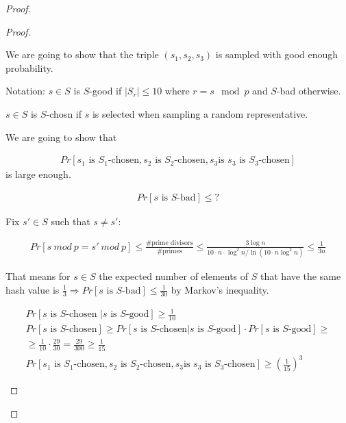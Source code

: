 \begin{proof}
\begin{proof}
\begin{enumerate}
		We are going to show that the triple $(s_1, s_2, s_3)$ is sampled with good enough probability.

		Notation: $s \in S$ is $S$-good if $|S_r| \leq 10$ where $r = s \mod p$ and $S$-bad otherwise.

		$s \in S$ is $S$-chosn if $s$ is selected when sampling a random representative.

		We are going to show that 

		\begin{align*}
		  Pr[s_1 \text{ is }S_1\text{-chosen}, s_2 \text{ is }S_2\text{-chosen}, s_3 \text{is } s_3\text{ is } S_3\text{-chosen}]
		\end{align*}
		is large enough.

		\begin{align*}
		  Pr[s \text{ is }S\text{-bad}] \leq ?
		\end{align*}

		Fix $s' \in S$ such that $s \neq s'$:

		\begin{align*}
		  Pr[s \ mod \ p = s' \ mod \ p] \leq \frac{\text{\# prime divisors}}{\text{\# primes}} \leq \frac{3\log n}{10 \cdot n \cdot \log^2 n / \ln(10 \cdot n \log^2 n)} \leq \frac{1}{3 n}
		\end{align*}

		That means for $s \in S$ the expected number of elements of $S$ that have the same hash value is $\frac{1}{3} \Longrightarrow Pr[s \text{ is } S\text{-bad}] \leq \frac{1}{30}$ by Markov's inequality.


		\begin{align*}
		  Pr[s \text{ is } S\text{-chosen } | s \text{ is  } S\text{-good}] \geq \frac{1}{10} \\
		  Pr[s \text { is } S\text{-chosen}] \geq Pr[s \text{ is } S\text{-chosen} | s \text{ is } S\text{-good}] \cdot Pr[s \text { is } S\text{-good}] \geq \\
		  \geq \frac{1}{10} \cdot \frac{29}{30} = \frac{29}{300} \geq \frac{1}{15} \\
		  Pr[s_1 \text{ is }S_1\text{-chosen}, s_2 \text{ is }S_2\text{-chosen}, s_3 \text{is } s_3\text{ is } S_3\text{-chosen}] \geq \left(\frac{1}{15}\right)^{3}
		\end{align*}

	\end{enumerate}
  \end{proof}



\end{proof}

